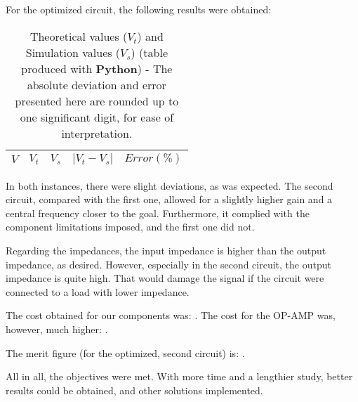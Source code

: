 For the optimized circuit, the following results were obtained:

\begin{table}[H]
  \centering
  \begin{tabular}{|c|c|c|c|c|}
    \hline
        $V$ & $V_t$ & $V_s$ & $|V_t-V_s|$ & $Error (\%)$ \\
        \hline
        \hline
        
        \hline
  \end{tabular}
  \caption{Theoretical values ($V_t$) and Simulation values ($V_s$) (table produced with {\bf Python})  - The absolute deviation and error presented here are rounded up to one significant digit, for ease of interpretation.}
  \label{error2_res}
\end{table}

In both instances, there were slight deviations, as was expected. The second circuit, compared with the first one, allowed for a slightly higher gain and a central frequency closer to the goal. Furthermore, it complied with the component limitations imposed, and the first one did not.


Regarding the impedances, the input impedance is higher than the output impedance, as desired. However, especially in the second circuit, the output impedance is quite high. That would damage the signal if the circuit were connected to a load with lower impedance.

The cost obtained for our components was: . The cost for the OP-AMP was, however, much higher: .

The merit figure (for the optimized, second circuit) is: .

All in all, the objectives were met. With more time and a lengthier study, better results could be obtained, and other solutions implemented.
